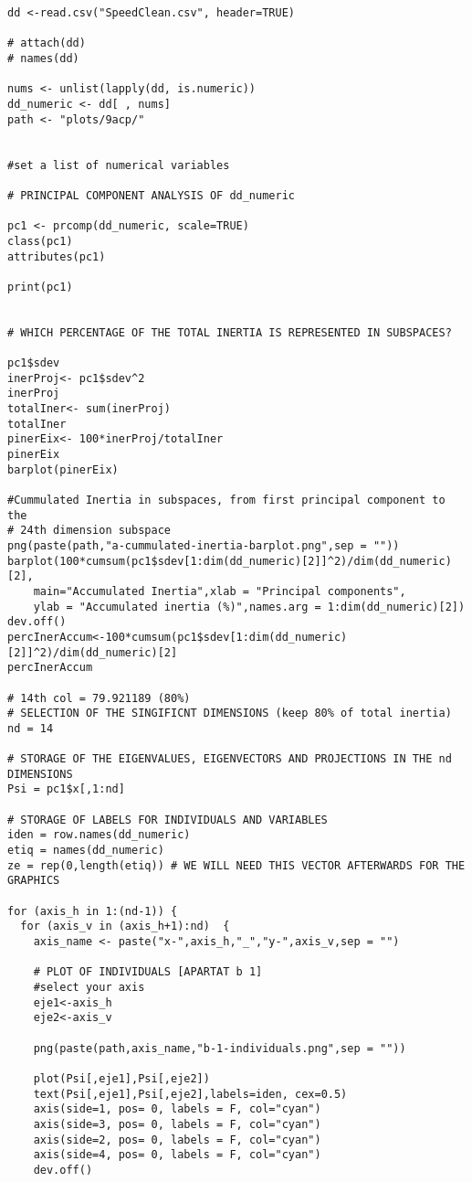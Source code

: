 \begin{verbatim}
dd <-read.csv("SpeedClean.csv", header=TRUE)

# attach(dd)
# names(dd)

nums <- unlist(lapply(dd, is.numeric))  
dd_numeric <- dd[ , nums]
path <- "plots/9acp/"


#set a list of numerical variables

# PRINCIPAL COMPONENT ANALYSIS OF dd_numeric

pc1 <- prcomp(dd_numeric, scale=TRUE)
class(pc1)
attributes(pc1)

print(pc1)


# WHICH PERCENTAGE OF THE TOTAL INERTIA IS REPRESENTED IN SUBSPACES?

pc1$sdev
inerProj<- pc1$sdev^2
inerProj
totalIner<- sum(inerProj)
totalIner
pinerEix<- 100*inerProj/totalIner
pinerEix
barplot(pinerEix)

#Cummulated Inertia in subspaces, from first principal component to the
# 24th dimension subspace
png(paste(path,"a-cummulated-inertia-barplot.png",sep = ""))
barplot(100*cumsum(pc1$sdev[1:dim(dd_numeric)[2]]^2)/dim(dd_numeric)[2],
    main="Accumulated Inertia",xlab = "Principal components",
    ylab = "Accumulated inertia (%)",names.arg = 1:dim(dd_numeric)[2])
dev.off()
percInerAccum<-100*cumsum(pc1$sdev[1:dim(dd_numeric)[2]]^2)/dim(dd_numeric)[2]
percInerAccum

# 14th col = 79.921189 (80%)
# SELECTION OF THE SINGIFICNT DIMENSIONS (keep 80% of total inertia)
nd = 14

# STORAGE OF THE EIGENVALUES, EIGENVECTORS AND PROJECTIONS IN THE nd DIMENSIONS
Psi = pc1$x[,1:nd]

# STORAGE OF LABELS FOR INDIVIDUALS AND VARIABLES
iden = row.names(dd_numeric)
etiq = names(dd_numeric)
ze = rep(0,length(etiq)) # WE WILL NEED THIS VECTOR AFTERWARDS FOR THE GRAPHICS

for (axis_h in 1:(nd-1)) {
  for (axis_v in (axis_h+1):nd)  {
    axis_name <- paste("x-",axis_h,"_","y-",axis_v,sep = "")
    
    # PLOT OF INDIVIDUALS [APARTAT b 1]
    #select your axis
    eje1<-axis_h
    eje2<-axis_v
    
    png(paste(path,axis_name,"b-1-individuals.png",sep = ""))
    
    plot(Psi[,eje1],Psi[,eje2])
    text(Psi[,eje1],Psi[,eje2],labels=iden, cex=0.5)
    axis(side=1, pos= 0, labels = F, col="cyan")
    axis(side=3, pos= 0, labels = F, col="cyan")
    axis(side=2, pos= 0, labels = F, col="cyan")
    axis(side=4, pos= 0, labels = F, col="cyan")
    dev.off()
    

\end{verbatim}
